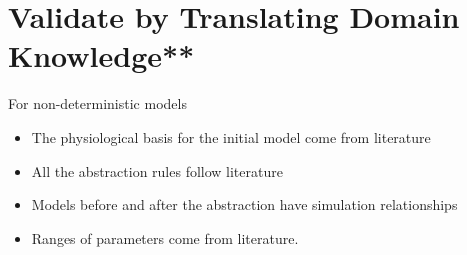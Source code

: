 \section{Validate by Translating Domain Knowledge**}
For non-deterministic models
\begin{itemize}
	\item The physiological basis for the initial model come from literature
    \item All the abstraction rules follow literature
    \item Models before and after the abstraction have simulation relationships
    \item Ranges of parameters come from literature.
\end{itemize}

 